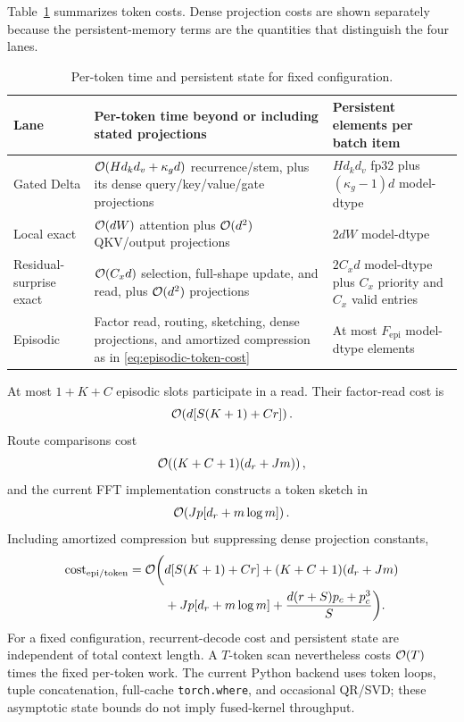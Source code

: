 Table~\ref{tab:lane-complexity} summarizes token costs.  Dense projection costs
are shown separately because the persistent-memory terms are the quantities
that distinguish the four lanes.

\begin{table}[t]
\centering
\small
\caption{Per-token time and persistent state for fixed configuration.}
\label{tab:lane-complexity}
\begin{tabularx}{\linewidth}{@{}l X X@{}}
\toprule
Lane & Per-token time beyond or including stated projections
     & Persistent elements per batch item \\
\midrule
Gated Delta
  & \(\mathcal{O}(Hd_kd_v+\kappa_gd)\) recurrence/stem, plus its dense
    query/key/value/gate projections
  & \(Hd_kd_v\) fp32 plus \((\kappa_g-1)d\) model-dtype \\
Local exact
  & \(\mathcal{O}(dW)\) attention plus \(\mathcal{O}(d^2)\) QKV/output projections
  & \(2dW\) model-dtype \\
Residual-surprise exact
  & \(\mathcal{O}(C_xd)\) selection, full-shape update, and read, plus
    \(\mathcal{O}(d^2)\) projections
  & \(2C_xd\) model-dtype plus \(C_x\) priority and \(C_x\) valid entries \\
Episodic
  & Factor read, routing, sketching, dense projections, and amortized
    compression as in \eqref{eq:episodic-token-cost}
  & At most \(F_{\mathrm{epi}}\) model-dtype elements \\
\bottomrule
\end{tabularx}
\end{table}

At most \(1+K+C\) episodic slots participate in a read.  Their factor-read
cost is
\begin{equation}
  \mathcal{O}\!\left(
    d[S(K+1)+Cr]
  \right).
\end{equation}
Route comparisons cost
\begin{equation}
  \mathcal{O}\!\left(
    (K+C+1)(d_r+Jm)
  \right),
\end{equation}
and the current FFT implementation constructs a token sketch in
\begin{equation}
  \mathcal{O}\!\left(
    Jp[d_r+m\log m]
  \right).
\end{equation}
Including amortized compression but suppressing dense projection constants,
\begin{equation}
  \begin{split}
  \operatorname{cost}_{\mathrm{epi/token}}
  =\mathcal{O}\bigg(
    &d[S(K+1)+Cr]
    +(K+C+1)(d_r+Jm)\\
    &+Jp[d_r+m\log m]
    +\frac{d(r+S)p_c+p_c^3}{S}
  \bigg).
  \end{split}
  \label{eq:episodic-token-cost}
\end{equation}
For a fixed configuration, recurrent-decode cost and persistent state are
independent of total context length.  A \(T\)-token scan nevertheless costs
\(\mathcal{O}(T)\) times the fixed per-token work.  The current Python backend uses
token loops, tuple concatenation, full-cache \texttt{torch.where}, and
occasional QR/SVD; these asymptotic state bounds do not imply fused-kernel
throughput.

